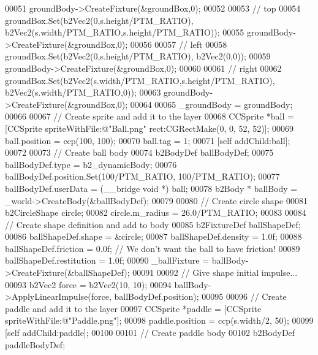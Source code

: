 \begin{DoxyCode}
00051         groundBody->CreateFixture(&groundBox,0); 
00052         
00053         \textcolor{comment}{// top}
00054         groundBox.Set(b2Vec2(0,s.height/PTM\_RATIO), b2Vec2(s.width/PTM\_RATIO,s.height/PTM\_RATIO));
00055         groundBody->CreateFixture(&groundBox,0);
00056         
00057         \textcolor{comment}{// left}
00058         groundBox.Set(b2Vec2(0,s.height/PTM\_RATIO), b2Vec2(0,0));
00059         groundBody->CreateFixture(&groundBox,0);
00060         
00061         \textcolor{comment}{// right}
00062         groundBox.Set(b2Vec2(s.width/PTM\_RATIO,s.height/PTM\_RATIO), b2Vec2(s.width/PTM\_RATIO,0));
00063         groundBody->CreateFixture(&groundBox,0);
00064         
00065         \_groundBody = groundBody;
00066         
00067         \textcolor{comment}{// Create sprite and add it to the layer}
00068         CCSprite *ball = [CCSprite spriteWithFile:@"Ball.png" rect:CGRectMake(0, 0, 52, 52)];
00069         ball.position = ccp(100, 100);
00070         ball.tag = 1;
00071         [\textcolor{keyword}{self} addChild:ball]; 
00072         
00073         \textcolor{comment}{// Create ball body }
00074         b2BodyDef ballBodyDef;
00075         ballBodyDef.type = b2\_dynamicBody;
00076         ballBodyDef.position.Set(100/PTM\_RATIO, 100/PTM\_RATIO);
00077         ballBodyDef.userData =  (\_\_bridge \textcolor{keywordtype}{void} *) ball;
00078         b2Body * ballBody = \_world->CreateBody(&ballBodyDef);
00079 
00080         \textcolor{comment}{// Create circle shape}
00081         b2CircleShape circle;
00082         circle.m\_radius = 26.0/PTM\_RATIO;
00083 
00084         \textcolor{comment}{// Create shape definition and add to body}
00085         b2FixtureDef ballShapeDef;
00086         ballShapeDef.shape = &circle;
00087         ballShapeDef.density = 1.0f;
00088         ballShapeDef.friction = 0.0f; \textcolor{comment}{// We don't want the ball to have friction!}
00089         ballShapeDef.restitution = 1.0f;
00090         \_ballFixture = ballBody->CreateFixture(&ballShapeDef);
00091         
00092         \textcolor{comment}{// Give shape initial impulse...}
00093         b2Vec2 force = b2Vec2(10, 10);
00094         ballBody->ApplyLinearImpulse(force, ballBodyDef.position);
00095         
00096         \textcolor{comment}{// Create paddle and add it to the layer}
00097         CCSprite *paddle = [CCSprite spriteWithFile:@"Paddle.png"];
00098         paddle.position = ccp(s.width/2, 50);
00099         [\textcolor{keyword}{self} addChild:paddle];
00100 
00101         \textcolor{comment}{// Create paddle body}
00102         b2BodyDef paddleBodyDef;

\end{DoxyCode}
